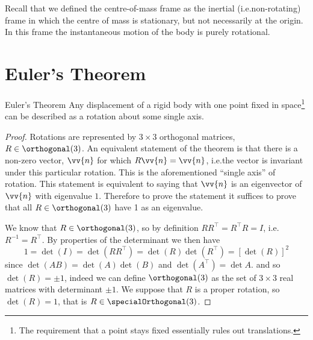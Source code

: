 \documentclass[fleqn]{NotesClass}
\newcommand*{\ident}{I}
\newcommand*{\trans}{\top}
\begin{document}
    Recall that we defined the centre-of-mass frame as the inertial (i.e.\@ non-rotating) frame in which the centre of mass is stationary, but not necessarily at the origin.
    In this frame the instantaneous motion of the body is purely rotational.
    
    \section{Euler's Theorem}
    \begin{thm}{Euler's Theorem}{}
        Any displacement of a rigid body with one point fixed in space\footnote{The requirement that a point stays fixed essentially rules out translations.} can be described as a rotation about some single axis.
        \begin{proof}
            Rotations are represented by \(3\times 3\) orthogonal matrices, \(R \in \orthogonal(3)\).
            An equivalent statement of the theorem is that there is a non-zero vector, \(\vv{n}\) for which \(R\vv{n} = \vv{n}\), i.e.\@ the vector is invariant under this particular rotation.
            This is the aforementioned \enquote{single axis} of rotation.
            This statement is equivalent to saying that \(\vv{n}\) is an eigenvector of \(\vv{n}\) with eigenvalue \(1\).
            Therefore to prove the statement it suffices to prove that all \(R\in\orthogonal(3)\) have 1 as an eigenvalue.
            
            We know that \(R \in \orthogonal(3)\), so by definition \(RR^{\trans} = R^{\trans}R = \ident\), i.e.\@ \(R^{-1} = R^{\trans}\).
            By properties of the determinant we then have
            \begin{equation}
                1 = \det(\ident) = \det(RR^\trans) = \det(R)\det(R^\trans) = [\det(R)]^2
            \end{equation}
            since \(\det(AB) = \det(A)\det(B)\) and \(\det(A^\trans) = \det A\).
            and so \(\det(R) = \pm 1\), indeed we can define \(\orthogonal(3)\) as the set of \(3\times 3\) real matrices with determinant \(\pm 1\).
            We suppose that \(R\) is a proper rotation, so \(\det(R) = 1\), that is \(R \in \specialOrthogonal(3)\).
            

\end{proof}
\end{thm}
\end{document}
